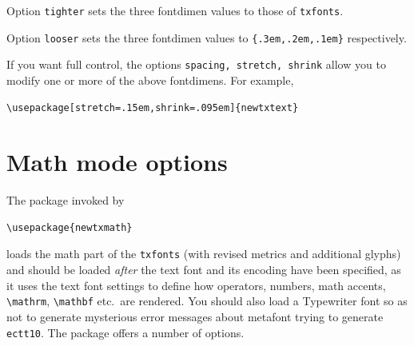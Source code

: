 \documentclass[\fsc]{article}
\theoremstyle{oldplain}
\theoremstyle{plain}
\begin{document}
Option {\tt tighter} sets the three fontdimen values to those of {\tt txfonts}.  

Option {\tt looser} sets the three fontdimen values to \verb|{.3em,.2em,.1em}| respectively. 

If you want full control, the options {\tt spacing, stretch, shrink} allow you to modify one or more of the above fontdimens. For example,
\begin{verbatim}
\usepackage[stretch=.15em,shrink=.095em]{newtxtext}
\end{verbatim}

\section{Math mode options}
The package invoked by
\begin{verbatim}
\usepackage{newtxmath}
\end{verbatim}
loads the math part of the {\tt txfonts} (with revised metrics and additional glyphs) and should be loaded \emph{after} the text font and its encoding have been specified, as it uses the text font settings to define how operators, numbers, math accents, \verb|\mathrm|, \verb|\mathbf| etc.\ are rendered. You should also load a Typewriter font so as not to generate mysterious error messages about \textsf{metafont} trying to generate \texttt{ectt10}. The package offers a number of options.
\end{document}
